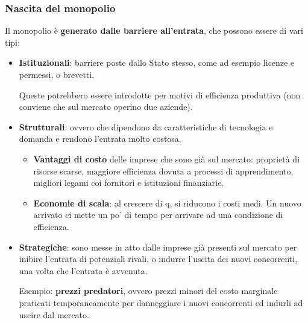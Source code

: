 \documentclass[../main.tex]{subfiles}
\begin{document}
\subsubsection{Nascita del monopolio}

Il monopolio è \textbf{generato dalle barriere all'entrata}, che possono essere di vari tipi:
\begin{itemize}
    \item \textbf{Istituzionali}: barriere poste dallo Stato stesso, come ad esempio licenze e permessi, o brevetti.

          Queste potrebbero essere introdotte per motivi di efficienza produttiva (non conviene che sul mercato operino due aziende).
    \item \textbf{Strutturali}: ovvero che dipendono da caratteristiche di tecnologia e domanda e rendono l'entrata molto costosa.
          \begin{itemize}
              \item \textbf{Vantaggi di costo} delle imprese che sono già sul mercato: proprietà di risorse scarse, maggiore efficienza dovuta a processi di apprendimento, migliori legami coi fornitori e istituzioni finanziarie.
              \item \textbf{Economie di scala}: al crescere di q, si riducono i costi medi. Un nuovo arrivato ci mette un po' di tempo per arrivare ad una condizione di efficienza.
          \end{itemize}
    \item \textbf{Strategiche}: sono messe in atto dalle imprese già presenti sul mercato per inibire l'entrata di potenziali rivali, o indurre l'uscita dei nuovi concorrenti, una volta che l'entrata è avvenuta.

          Esempio: \textbf{prezzi predatori}, ovvero prezzi minori del costo marginale praticati temporaneamente per danneggiare i nuovi concorrenti ed indurli ad uscire dal mercato.
\end{itemize}
\end{document}
